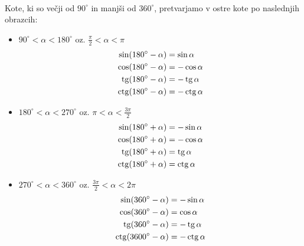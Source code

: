 \ 

Kote, ki so večji od $90^{\circ}$ in manjši od $360^{\circ}$, pretvarjamo v ostre kote po naslednjih obrazcih:
\begin{itemize}
\item $90^{\circ} <\alpha<180^{\circ}$ oz. $\frac{\pi}{2}<\alpha<\pi$
\begin{align*}
\sin(180^{\circ}-\alpha)&=\sin\alpha \\
\cos(180^{\circ}-\alpha)&=-\cos\alpha \\
\operatorname{tg}(180^{\circ}-\alpha) &=-\operatorname{tg}\alpha \\
\operatorname{ctg}(180^{\circ}-\alpha)&= -\operatorname{ctg}\alpha
\end{align*}

\item $180^{\circ} <\alpha<270^{\circ}$ oz. $\pi<\alpha<\frac{3\pi}{2}$
\begin{align*}
\sin(180^{\circ}+\alpha)&=-\sin\alpha \\
\cos(180^{\circ}+\alpha)&=-\cos\alpha \\
\operatorname{tg}(180^{\circ}+\alpha) &=\operatorname{tg}\alpha \\
\operatorname{ctg}(180^{\circ}+\alpha)&= \operatorname{ctg}\alpha
\end{align*}

\item $270^{\circ} <\alpha<360^{\circ}$ oz. $\frac{3\pi}{2}<\alpha<2\pi$
\begin{align*}
\sin(360^{\circ}-\alpha)&=-\sin\alpha \\
\cos(360^{\circ}-\alpha)&=\cos\alpha \\
\operatorname{tg}(360^{\circ}-\alpha) &=-\operatorname{tg}\alpha \\
\operatorname{ctg}(3600^{\circ}-\alpha)&=-\operatorname{ctg}\alpha
\end{align*}
\end{itemize}

